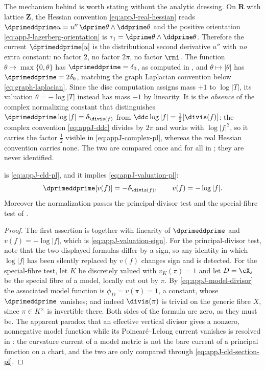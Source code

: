 \begin{remark}
\label{rem:ch15-constant-reading}
The mechanism behind  is worth stating without
the analytic dressing.  On $\mathbf R$ with lattice $\mathbf Z$, the Hessian
convention \eqref{eq:appJ-real-hessian} reads
$\dprimeddprime u=u''\,\dprime\theta\wedge\ddprime\theta$ and the positive
orientation \eqref{eq:appJ-lagerberg-orientation} is
$\tau_1=\dprime\theta\wedge\ddprime\theta$.  Therefore the current
$\dprimeddprime[u]$ is the distributional second derivative $u''$ with
\emph{no} extra constant: no factor $2$, no factor $2\pi$, no factor
$\rmi$.  The function $\theta\mapsto\max\{0,\theta\}$ has
$\dprimeddprime=\delta_0$, as computed in , and
$\theta\mapsto|\theta|$ has $\dprimeddprime=2\delta_0$, matching the graph
Laplacian convention below \eqref{eq:graph-laplacian}.  Since
the disc computation assigns mass $+1$ to $\log|T|$, its valuation
$\theta=-\log|T|$ instead has mass $-1$ by linearity.  It is the \emph{absence} of the complex
normalizing constant that distinguishes
$\dprimeddprime\log|f|=\delta_{\divis(f)}$ from
$\ddc\log|f|=\tfrac12[\divis(f)]$: the complex convention
\eqref{eq:appJ-ddc} divides by $2\pi$ and works with $\log|f|^2$, so it
carries the factor $\tfrac12$ visible in \eqref{eq:appJ-complex-pl}, whereas
the real Hessian convention carries none.  The two are compared once and for
all in ; they are never identified.
\end{remark}

\begin{corollary}
\label{cor:ch15-appJ-consistency}
 is \eqref{eq:appJ-cld-pl}, and it implies
\eqref{eq:appJ-valuation-pl}:
\[
 \dprimeddprime[v(f)]=-\delta_{\divis(f)},
 \qquad v(f)=-\log|f| .
\]
Moreover the normalization passes the principal-divisor test and the
special-fibre test of .
\end{corollary}

\begin{proof}
The first assertion is  together with linearity
of $\dprimeddprime$ and $v(f)=-\log|f|$, which is
\eqref{eq:appJ-valuation-sign}.  For the principal-divisor test, note that
the two displayed formulas differ by a sign, so any identity in which
$\log|f|$ has been silently replaced by $v(f)$ changes sign and is detected.
For the special-fibre test, let $K$ be discretely valued with $v_K(\pi)=1$
and let $D=\cX_s$ be the special fibre of a model, locally cut out by $\pi$.
By \eqref{eq:appJ-model-divisor} the associated model function is
$\phi_D=v(\pi)=1$, a constant, whose $\dprimeddprime$ vanishes; and indeed
$\divis(\pi)$ is trivial on the generic fibre $X$, since $\pi\in K^\times$ is
invertible there.  Both sides of the formula are zero, as they must be.  The
apparent paradox that an effective vertical divisor gives a nonzero,
nonnegative model function while its Poincar\'e--Lelong current vanishes is
resolved in : the curvature current of a model metric is
not the bare current of a principal function on a chart, and the two are only
compared through \eqref{eq:appJ-cld-section-pl}.
\end{proof}

